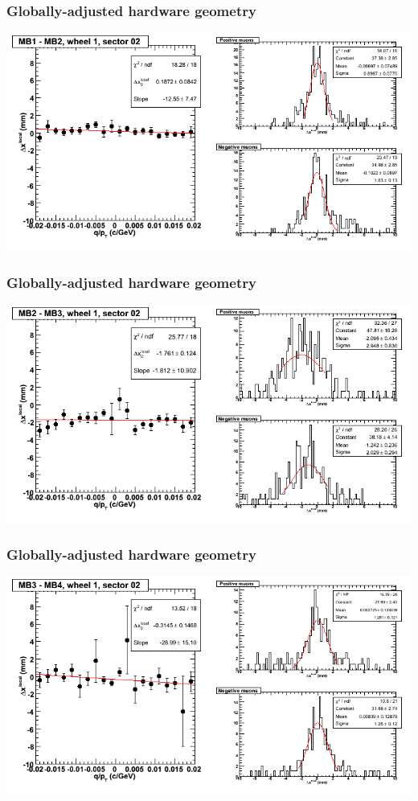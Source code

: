 \documentclass[compress]{beamer}
\begin{document}
\begin{frame}
\frametitle{Globally-adjusted hardware geometry}
\includegraphics[width=\linewidth]{NOV4_segdiffs_HW/dt13_resid_D_02_12.png}
\end{frame}

\begin{frame}
\frametitle{Globally-adjusted hardware geometry}
\includegraphics[width=\linewidth]{NOV4_segdiffs_HW/dt13_resid_D_02_23.png}
\end{frame}

\begin{frame}
\frametitle{Globally-adjusted hardware geometry}
\includegraphics[width=\linewidth]{NOV4_segdiffs_HW/dt13_resid_D_02_34.png}
\end{frame}
\end{document}
